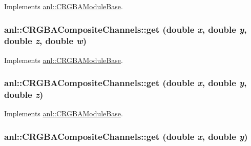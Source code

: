 Implements \hyperlink{classanl_1_1CRGBAModuleBase_aa5a0b719101302596a697aa8c2292f55}{anl::CRGBAModuleBase}.\hypertarget{classanl_1_1CRGBACompositeChannels_a3964f2c61aa0b8976a40487088dfcc6b}{
\subsubsection[{get}]{ anl::CRGBACompositeChannels::get (double {\em x}, \/  double {\em y}, \/  double {\em z}, \/  double {\em w})}}
\label{classanl_1_1CRGBACompositeChannels_a3964f2c61aa0b8976a40487088dfcc6b}


Implements \hyperlink{classanl_1_1CRGBAModuleBase_ab94523074ef298bb99f0830051e78c1c}{anl::CRGBAModuleBase}.\hypertarget{classanl_1_1CRGBACompositeChannels_a9c3fb9f5a932d5cdd585d53ecab11fa5}{
\subsubsection[{get}]{ anl::CRGBACompositeChannels::get (double {\em x}, \/  double {\em y}, \/  double {\em z})}}
\label{classanl_1_1CRGBACompositeChannels_a9c3fb9f5a932d5cdd585d53ecab11fa5}


Implements \hyperlink{classanl_1_1CRGBAModuleBase_a097897c2d625c824832325260169c90e}{anl::CRGBAModuleBase}.\hypertarget{classanl_1_1CRGBACompositeChannels_afbae35ad9a4608d0d2a375636b538d8f}{
\subsubsection[{get}]{ anl::CRGBACompositeChannels::get (double {\em x}, \/  double {\em y})}}
\label{classanl_1_1CRGBACompositeChannels_afbae35ad9a4608d0d2a375636b538d8f}


